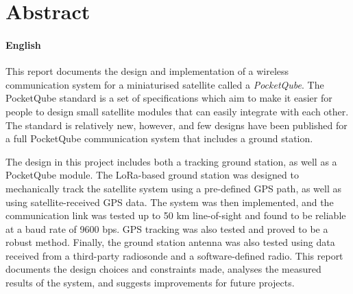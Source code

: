 \chapter*{Abstract}
\makeatletter{}\makeatother

\subsubsection*{English}

This report documents the design and implementation of a wireless communication system for a miniaturised satellite called a \textit{PocketQube}. The PocketQube standard is a set of specifications which aim to make it easier for people to design small satellite modules that can easily integrate with each other. The standard is relatively new, however, and few designs have been published for a full PocketQube communication system that includes a ground station.

The design in this project includes both a tracking ground station, as well as a PocketQube module. The LoRa-based ground station was designed to mechanically track the satellite system using a pre-defined GPS path, as well as using satellite-received GPS data. The system was then implemented, and the communication link was tested up to 50 km line-of-sight and found to be reliable at a baud rate of 9600 bps. GPS tracking was also tested and proved to be a robust method. Finally, the ground station antenna was also tested using data received from a third-party radiosonde and a software-defined radio. This report documents the design choices and constraints made, analyses the measured results of the system, and suggests improvements for future projects.

